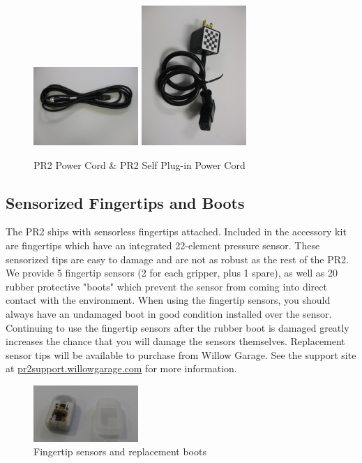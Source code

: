\begin{figure}[h!]
\centering
\includegraphics[width=150px]{images/long_plug.png}
\includegraphics[width=150px]{images/short_plug.png}
\caption{PR2 Power Cord \& PR2 Self Plug-in Power Cord}
\label{fig:powercords}
\end{figure}
\label{powercords}


\subsection{Sensorized Fingertips and Boots}
The PR2 ships with sensorless
fingertips attached.  Included in the accessory kit are fingertips which have an integrated
22-element pressure sensor. These sensorized tips are easy to damage and are not as robust as
the rest of the PR2.  We provide 5 fingertip sensors (2 for each gripper, plus 1
spare), as well as 20 rubber protective "boots" which prevent the sensor from
coming into direct contact with the environment.  When using the fingertip
sensors, you should always have an undamaged boot in good condition installed
over the sensor.  Continuing to use the fingertip sensors after the rubber boot
is damaged greatly increases the chance that you will damage the sensors
themselves.  Replacement sensor tips will be available to purchase from Willow Garage.  
See the support site at \href{http://pr2support.willowgarage.com}{pr2support.willowgarage.com} for more information.

\begin{figure}[h!]
\centering
\includegraphics[width=150px]{images/fingertips.png}
\caption{Fingertip sensors and replacement boots}
\label{fig:fingertips}
\end{figure}
\label{fingertips}




